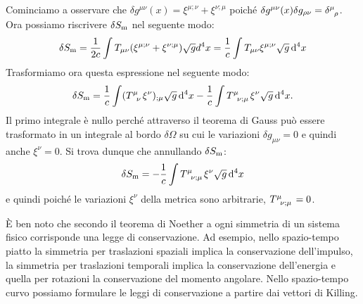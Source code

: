 Cominciamo a osservare che $\delta g^{\mu \nu}(x) = \xi^{\mu;\nu}+\xi^{\nu;\mu}$
poiché $\delta g^{\mu \nu}(x) \delta g_{\rho \nu} =
\tensor{\delta}{^{\mu}_{\rho}}$.  Ora possiamo riscrivere $\delta
S_{\textup{m}}$ nel seguente modo:
\begin{equation}
  \delta S_{\textup{m}} = \frac{1}{2c}\int T_{\mu \nu} (\xi^{\mu ;\nu} +
  \xi^{\nu;\mu}) \sqrt{g} d^4x = \frac{1}{c} \int T_{\mu \nu}  \xi^{\mu;\nu}
  \sqrt{g} \mathop{}\!\mathrm{d}^4x
\end{equation}
Trasformiamo ora questa espressione nel seguente modo:
\begin{equation}
  \delta S_{\textup{m}} = \frac{1}{c} \int (\tensor{T}{^{\mu}_{\nu}}  \xi^{\nu})_{;\mu}
  \sqrt{g} \dd^4x - \frac{1}{c} \int \tensor{T}{^{\mu}_{\nu; \mu}} \xi^{\nu}
  \sqrt{g} \dd^4x.
\end{equation}
Il primo integrale è nullo perché attraverso il teorema di Gauss può essere
trasformato in un integrale al bordo $\delta \Omega$ su cui le variazioni
$\delta g_{\mu \nu}=0$ e quindi anche $\xi^{\nu}=0$.  Si trova dunque che
annullando $\delta S_{\textup{m}}$:
\begin{equation}
  \delta S_{\textup{m}} = - \frac{1}{c} \int \tensor{T}{^{\mu}_{\nu; \mu}}
  \xi^{\nu} \sqrt{g} \dd^4x
\end{equation}
e quindi poiché le variazioni $\xi^{\nu}$ della metrica sono arbitrarie,
$\tensor{T}{^{\mu}_{\nu;\mu}}=0$.

È ben noto che secondo il teorema di Noether a ogni simmetria di un sistema
fisico corrisponde una legge di conservazione.  Ad esempio, nello spazio-tempo
piatto la simmetria per traslazioni spaziali implica la conservazione
dell'impulso, la simmetria per traslazioni temporali implica la conservazione
dell'energia e quella per rotazioni la conservazione del momento angolare.
Nello spazio-tempo curvo possiamo formulare le leggi di conservazione a partire
dai vettori di Killing.

